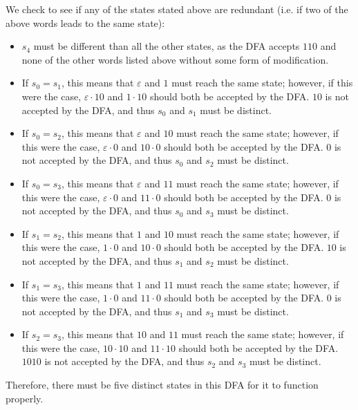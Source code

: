\documentclass{article}
\begin{document}
\noindent We check to see if any of the states stated above are redundant (i.e. if two of the above words leads to the same state):
\begin{itemize}
    \item \(s_4\) must be different than all the other states, as the DFA accepts \(110\) and none of the other words listed above without some form of modification.
    \item If \(s_0 = s_1\), this means that \(\varepsilon\) and \(1\) must reach the same state; however, if this were the case, \(\varepsilon \cdot 10\) and \(1 \cdot 10\) should both be accepted by the DFA. \(10\) is not accepted by the DFA, and thus \(s_0\) and \( s_1\) must be distinct.
    \item If \(s_0 = s_2\), this means that \(\varepsilon\) and \(10\) must reach the same state; however, if this were the case, \(\varepsilon \cdot 0\) and \(10 \cdot 0\) should both be accepted by the DFA. \(0\) is not accepted by the DFA, and thus \(s_0\) and \( s_2\) must be distinct.
    \item If \(s_0 = s_3\), this means that \(\varepsilon\) and \(11\) must reach the same state; however, if this were the case, \(\varepsilon \cdot 0\) and \(11 \cdot 0\) should both be accepted by the DFA. \(0\) is not accepted by the DFA, and thus \(s_0\) and \( s_3\) must be distinct.
    \item If \(s_1 = s_2\), this means that \(1\) and \(10\) must reach the same state; however, if this were the case, \(1 \cdot 0\) and \(10 \cdot 0\) should both be accepted by the DFA. \(10\) is not accepted by the DFA, and thus \(s_1\) and \( s_2\) must be distinct.
    \item If \(s_1 = s_3\), this means that \(1\) and \(11\) must reach the same state; however, if this were the case, \(1 \cdot 0\) and \(11 \cdot 0\) should both be accepted by the DFA. \(0\) is not accepted by the DFA, and thus \(s_1\) and \( s_3\) must be distinct.
    \item If \(s_2 = s_3\), this means that \(10\) and \(11\) must reach the same state; however, if this were the case, \(10 \cdot 10\) and \(11 \cdot 10\) should both be accepted by the DFA. \(1010\) is not accepted by the DFA, and thus \(s_2\) and \( s_3\) must be distinct.
\end{itemize}
Therefore, there must be five distinct states in this DFA for it to function properly.
\end{document}
